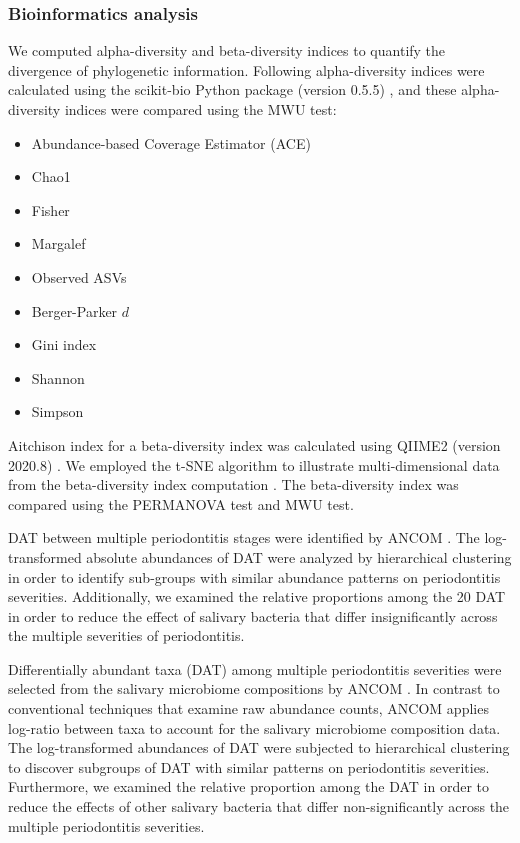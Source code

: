 \documentclass[11pt, a4paper, onecolumn, oneside]{report}
\begin{document}
            \subsubsection{Bioinformatics analysis}
                We computed alpha-diversity and beta-diversity indices to quantify the divergence of phylogenetic information. Following alpha-diversity indices were calculated using the scikit-bio Python package (version 0.5.5) \cite{scikit-bio-1}, and these alpha-diversity indices were compared using the MWU test:
                \begin{itemize}[noitemsep, nolistsep]
                    \item Abundance-based Coverage Estimator (ACE) \cite{ACE-1}
                    \item Chao1 \cite{chao1-1}
                    \item Fisher \cite{fisher-1}
                    \item Margalef \cite{margalef-1}
                    \item Observed ASVs \cite{observed-ASVs-1}
                    \item Berger-Parker $d$ \cite{Berger-1}
                    \item Gini index \cite{Gini-1}
                    \item Shannon \cite{Shannon-1}
                    \item Simpson \cite{Simpson-1}
                \end{itemize}

                Aitchison index for a beta-diversity index was calculated using QIIME2 (version 2020.8) \cite{Aitchison-1, QIIME2-1}. We employed the t-SNE algorithm to illustrate multi-dimensional data from the beta-diversity index computation \cite{tSNE-1}. The beta-diversity index was compared using the PERMANOVA test \cite{PERMANOVA-1, PERMANOVA-2} and MWU test.

                DAT between multiple periodontitis stages were identified by ANCOM \cite{ANCOM-1}. The log-transformed absolute abundances of DAT were analyzed by hierarchical clustering in order to identify sub-groups with similar abundance patterns on periodontitis severities. Additionally, we examined the relative proportions among the 20 DAT in order to reduce the effect of salivary bacteria that differ insignificantly across the multiple severities of periodontitis.

                Differentially abundant taxa (DAT) among multiple periodontitis severities were selected from the salivary microbiome compositions by ANCOM \cite{ANCOM-1}. In contrast to conventional techniques that examine raw abundance counts, ANCOM applies log-ratio between taxa to account for the salivary microbiome composition data. The log-transformed abundances of DAT were subjected to hierarchical clustering to discover subgroups of DAT with similar patterns on periodontitis severities. Furthermore, we examined the relative proportion among the DAT in order to reduce the effects of other salivary bacteria that differ non-significantly across the multiple periodontitis severities.
\end{document}
